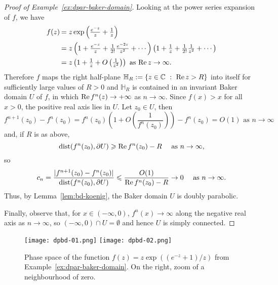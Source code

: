 \documentclass[a4paper, 12pt, reqno]{amsart}
\numberwithin{equation}{section}
\theoremstyle{plain}
\theoremstyle{definition}
\theoremstyle{remark}
\newcommand{\C}{{\mathbb{C}}}
\begin{document}
\begin{proof}[Proof of Example~\ref{ex:dpar-baker-domain}]
Looking at the power series expansion of $f$, we have 
$$
\begin{array}{rl}
f(z)\hspace*{-8pt} & = z\exp\left(\tfrac{e^{-z}}{z}+\tfrac{1}{z}\right)\vspace{5pt}\\
& = z\left(1+\tfrac{e^{-z}}{z}+\tfrac{1}{2!}\tfrac{e^{-2z}}{z^2}+\cdots\right)\left(1+\tfrac{1}{z}+\tfrac{1}{2!}\tfrac{1}{z^2}+\cdots   \right)\vspace{5pt}\\
& =  z\left(1+\tfrac{1}{z}+O\left(\tfrac{1}{z^2}\right)\right) \mbox{ as } \textup{Re}\,z\to\infty.
\end{array}
$$
Therefore $f$ maps the right half-plane $\mathbb H_R:=\{z\in\C\ :\ \textup{Re}\, z>R\}$ into itself for sufficiently large values of $R>0$ and $\mathbb H_R$ is contained in an invariant Baker domain $U$ of $f$, in which $\textup{Re}\,f^n(z)\to+\infty$ as $n\to\infty$. Since $f(x)>x$ for all $x>0$, the positive real axis lies in $U$. Let $z_0\in U$, then
$$
f^{n+1}(z_0)-f^n(z_0)\! =\! f^n(z_0)\! \left(\! 1+O\! \left(\! \frac{1}{f^n(z_0)}\! \right)\! \right)-f^n(z_0)\! =\! O(1)\mbox{ as } n\to \infty
$$
and, if $R$ is as above,
$$
\textup{dist}(f^n(z_0),\partial U)\geqslant \textup{Re}\,f^n(z_0)-R \quad \mbox{ as } n\to \infty,
$$
so 
$$
c_n=\frac{|f^{n+1}(z_0)-f^{n}(z_0)|}{\textup{dist}(f^{n}(z_0),\partial U)}\leqslant \frac{O(1)}{\textup{Re}\,f^n(z_0)-R}\to 0 \quad \mbox{ as } n\to\infty.
$$
Thus, by Lemma~\ref{lem:bd-koenig}, the Baker domain $U$ is doubly parabolic.

Finally, observe that, for $x\in (-\infty,0)$, $f^n(x)\to \infty$ along the negative real axis as $n\to\infty$, so $(-\infty,0)\cap U=\emptyset$ and hence $U$ is simply connected.
\end{proof}

\begin{figure}[h!]
\texttt{[image: dpbd-01.png]}
\texttt{[image: dpbd-02.png]}%
\caption[\mbox{Phase space of a transcendental self-map of $\C^*$} \mbox{which has a doubly parabolic Baker domain}]{Phase space of the function $f(z)=z\exp\left((e^{-z}+1)/z\right)$ from Example~\ref{ex:dpar-baker-domain}. On the right, zoom of a neighbourhood of zero.}
\label{fig:dpar-baker-domain}
\end{figure}
\end{document}
